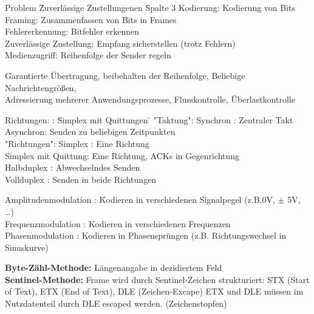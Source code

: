 

\begin{tabbing}
Problem \= Zuverlässige Zustellungenen \= Spalte 3  \kill
\> Kodierung:	\> Kodierung von Bits	\\
\> Framing:		\> Zusammenfassen von Bits in Frames	\\
\> Fehlererkennung: \> Bitfehler erkennen	\\
\> Zuverlässige Zustellung: \> Empfang sicherstellen (trotz Fehlern)	\\
\> Medienzugriff: \> Reihenfolge der Sender regeln	
\end{tabbing}

Garantierte Übertragung, beibehalten der Reihenfolge, Beliebige Nachrichtengrößen, \\
Adressierung mehrerer Anwendungsprozesse, Flusskontrolle, Überlastkontrolle

\begin{tabbing}
Richtungen: : \= Simplex mit Quittungen  \=  \kill
"Taktung":\> Synchron : \> Zentraler Takt\\
	\> Asynchron: \> Senden zu beliebigen Zeitpunkten\\
"Richtungen":\> Simplex : \> Eine Richtung	\\
	\> Simplex mit Quittung: \> Eine Richtung, ACKs in Gegenrichtung\\
	\> Halbduplex : \> Abwechselndes Senden	\\	
	\> Vollduplex : \> Senden in beide Richtungen	
\end{tabbing}


\begin{tabbing}
Amplitudenmodulation : \= Kodieren in verschiedenen Signalpegel (z.B.0V, $\pm$ 5V, \dots)\\
Frequenzmodulation : \> Kodieren in verschiedenen Frequenzen \\
Phasenmodulation : \> Kodieren in Phasensprüngen (z.B. Richtungswechsel in Sinuskurve)	
\end{tabbing}


\textbf{Byte-Zähl-Methode:} Längenangabe in dezidiertem Feld\\
\textbf{Sentinel-Methode:} Frame wird durch Sentinel-Zeichen strukturiert: STX (Start of Text), ETX (End of Text), DLE (Zeichen-Excape)
ETX und DLE müssen im Nutzdatenteil durch DLE escaped werden. (Zeichenstopfen)


